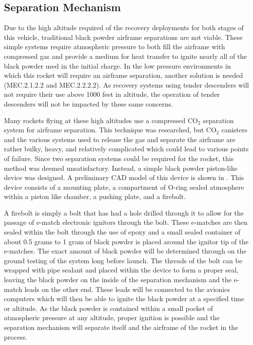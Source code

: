 \subsection{Separation Mechanism} \label{section:sep-mech}
Due to the high altitude required of the recovery deployments for both stages of this vehicle, traditional black powder airframe separations are not viable. These simple systems require atmospheric pressure to both fill the airframe with compressed gas and provide a medium for heat transfer to ignite nearly all of the black powder used in the initial charge. In the low pressure environments in which this rocket will require an airframe separation, another solution is needed (MEC.2.1.2.2 and MEC.2.2.2.2). As recovery systems using tender descenders will not require their use above 1000 feet in altitude, the operation of tender descenders will not be impacted by these same concerns. 

Many rockets flying at these high altitudes use a compressed CO\(_2\) separation system for airframe separation. This technique was researched, but CO\(_2\) canisters and the various systems used to release the gas and separate the airframe are rather bulky, heavy, and relatively complicated which could lead to various points of failure. Since two separation systems could be required for the rocket, this method was deemed unsatisfactory. Instead, a simple black powder piston-like device was designed. A preliminary CAD model of this device is shown in . This device consists of a mounting plate, a compartment of O-ring sealed atmosphere within a piston like chamber, a pushing plate, and a firebolt.

A firebolt is simply a bolt that has had a hole drilled through it to allow for the passage of e-match electronic ignitors through the bolt. These e-matches are then sealed within the bolt through the use of epoxy and a small sealed container of  about 0.5 grams to 1 gram of black powder is placed around the ignitor tip of the e-matches. The exact amount of black powder will be determined through on the ground testing of the system long before launch. The threads of the bolt can be wrapped with pipe sealant and placed within the device to form a proper seal, leaving the black powder on the inside of the separation mechanism and the e-match leads on the other end. These leads will be connected to the avionics computers which will then be able to ignite the black powder at a specified time or altitude. As the black powder is contained within a small pocket of atmospheric pressure at any altitude, proper ignition is possible and the separation mechanism will separate itself and the airframe of the rocket in the process.

